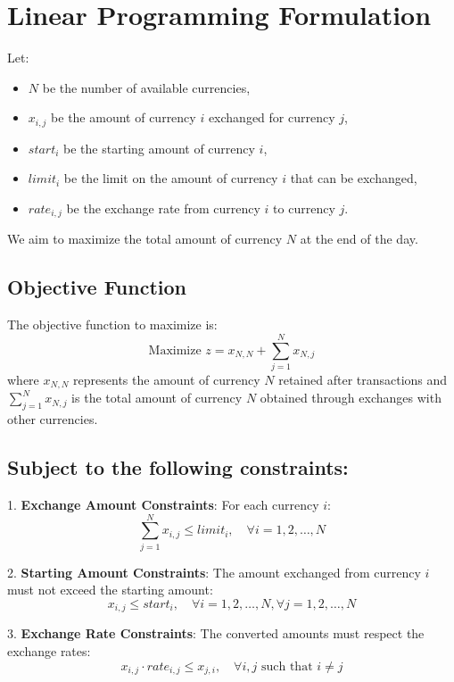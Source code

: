 \documentclass{article}
\begin{document}
\section*{Linear Programming Formulation}

Let:
\begin{itemize}
    \item \(N\) be the number of available currencies,
    \item \(x_{i,j}\) be the amount of currency \(i\) exchanged for currency \(j\),
    \item \(start_i\) be the starting amount of currency \(i\),
    \item \(limit_i\) be the limit on the amount of currency \(i\) that can be exchanged,
    \item \(rate_{i,j}\) be the exchange rate from currency \(i\) to currency \(j\).
\end{itemize}

We aim to maximize the total amount of currency \(N\) at the end of the day.

\subsection*{Objective Function}

The objective function to maximize is:
\[
\text{Maximize } z = x_{N, N} + \sum_{j=1}^{N} x_{N,j}
\]
where \(x_{N, N}\) represents the amount of currency \(N\) retained after transactions and \(\sum_{j=1}^{N} x_{N,j}\) is the total amount of currency \(N\) obtained through exchanges with other currencies.

\subsection*{Subject to the following constraints:}

1. \textbf{Exchange Amount Constraints}:
   For each currency \(i\):
   \[
   \sum_{j=1}^{N} x_{i,j} \leq limit_i, \quad \forall i = 1, 2, \ldots, N
   \]

2. \textbf{Starting Amount Constraints}:
   The amount exchanged from currency \(i\) must not exceed the starting amount:
   \[
   x_{i,j} \leq start_i, \quad \forall i = 1, 2, \ldots, N, \forall j = 1, 2, \ldots, N
   \]

3. \textbf{Exchange Rate Constraints}:
   The converted amounts must respect the exchange rates:
   \[
   x_{i,j} \cdot rate_{i,j} \leq x_{j,i}, \quad \forall i,j \text{ such that } i \neq j
   \]
\end{document}
